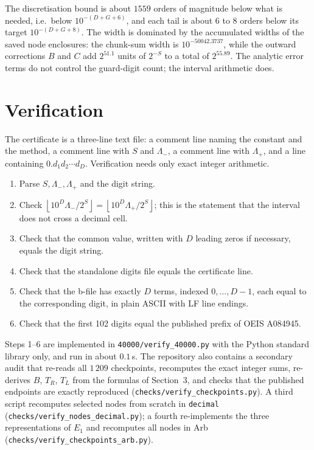 \documentclass[11pt,a4paper]{article}
\theoremstyle{remark}
\newcommand{\Eone}{E_1}
\newcommand{\floor}[1]{\left\lfloor #1 \right\rfloor}
\begin{document}
The discretisation bound is about $1559$ orders of magnitude below what
is needed, i.e.\ below $10^{-(D+G+6)}$, and each tail is about $6$ to
$8$ orders below its target $10^{-(D+G+8)}$. The
width is dominated by the accumulated widths of the saved node
enclosures: the chunk-sum width is $10^{-50042.3737}$, while the
outward corrections $B$ and $C$ add $2^{51.1}$ units of $2^{-S}$ to a
total of $2^{55.89}$. The analytic error terms do not control the
guard-digit count; the interval arithmetic does.

\section{Verification}

The certificate is a three-line text file: a comment line naming the
constant and the method, a comment line with $S$ and $\Lambda_-$, a
comment line with $\Lambda_+$, and a line containing
$0.d_1d_2\cdots d_D$. Verification needs only exact integer arithmetic.

\begin{enumerate}[leftmargin=1.6em]
\item Parse $S,\Lambda_-,\Lambda_+$ and the digit string.
\item Check $\floor{10^D\Lambda_-/2^S}=\floor{10^D\Lambda_+/2^S}$;
  this is the statement that the interval does not cross a decimal cell.
\item Check that the common value, written with $D$ leading zeros if
  necessary, equals the digit string.
\item Check that the standalone digits file equals the certificate line.
\item Check that the b-file has exactly $D$ terms, indexed
  $0,\ldots,D-1$, each equal to the corresponding digit, in plain ASCII
  with LF line endings.
\item Check that the first 102 digits equal the published prefix of OEIS
  A084945.
\end{enumerate}

Steps 1--6 are implemented in \texttt{40000/verify\_40000.py} with the
Python standard library only, and run in about $0.1$\,s. The repository
also contains a secondary audit that re-reads all $1\,209$ checkpoints,
recomputes the exact integer sums, re-derives $B$, $T_R$, $T_L$ from the
formulas of Section~3, and checks that the published endpoints are
exactly reproduced
(\texttt{checks/verify\_checkpoints.py}). A third script recomputes
selected nodes from scratch in \texttt{decimal}
(\texttt{checks/verify\_nodes\_decimal.py}); a fourth re-implements the
three representations of $\Eone$ and recomputes all nodes in Arb
(\texttt{checks/verify\_checkpoints\_arb.py}).
\end{document}

